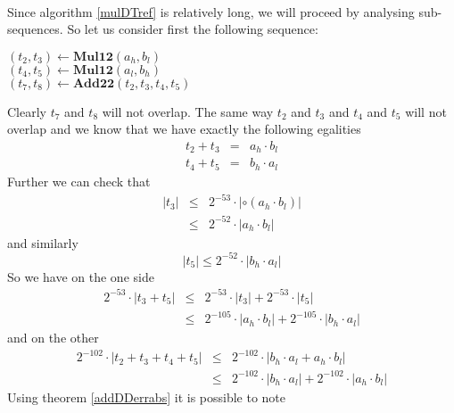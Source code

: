 \documentclass[a4paper,10pt,twoside]{article}
\newenvironment{proof}[1][Proof]{\begin{trivlist}
\item[\hskip \labelsep {\bfseries #1}]}{\end{trivlist}}
\newcommand{\hi}{\ensuremath{\mathit{h}}}
\newcommand{\lo}{\ensuremath{\mathit{l}}}
\newcommand{\mAddDD}{\ensuremath{\mathbf{Add22}}}
\newcommand{\mMul}{\ensuremath{\mathbf{Mul12}}}
\begin{document}
\begin{proof} ~ \\
Since algorithm \ref{mulDTref} is relatively long, we will proceed by analysing sub-sequences. So let us consider
first the following sequence:
\begin{center}
\begin{minipage}[b]{50mm}
$\left( t_2, t_3 \right) \gets \mMul\left( a_\hi, b_\lo \right)$ \\
$\left( t_4, t_5 \right) \gets \mMul\left( a_\lo, b_\hi \right)$ \\
$\left( t_7, t_8 \right) \gets \mAddDD\left( t_2, t_3, t_4, t_5 \right)$ 
\end{minipage}
\end{center}
Clearly $t_7$ and $t_8$ will not overlap. The same way $t_2$ and $t_3$ and $t_4$ and $t_5$ will not overlap and 
we know that we have exactly the following egalities
\begin{eqnarray*}
t_2 + t_3 & = & a_\hi \cdot b_\lo \\
t_4 + t_5 & = & b_\hi \cdot a_\lo 
\end{eqnarray*}
Further we can check that 
\begin{eqnarray*}
\left \vert t_3 \right \vert & \leq & 2^{-53} \cdot \left \vert \circ \left( a_\hi \cdot b_\lo \right) \right \vert \\
& \leq & 2^{-52} \cdot \left \vert a_\hi \cdot b_\lo \right \vert 
\end{eqnarray*}
and similarly
$$\left \vert t_5 \right \vert \leq 2^{-52} \cdot \left \vert b_\hi \cdot a_\lo \right \vert$$
So we have on the one side
\begin{eqnarray*}
2^{-53} \cdot \left \vert t_3 + t_5 \right \vert & \leq & 2^{-53} \cdot \left \vert t_3 \right \vert + 2^{-53} \cdot \left \vert t_5 \right \vert \\
& \leq & 2^{-105} \cdot \left \vert a_\hi \cdot b_\lo \right \vert + 2^{-105} \cdot \left \vert b_\hi \cdot a_\lo \right \vert 
\end{eqnarray*}
and on the other
\begin{eqnarray*}
2^{-102} \cdot \left \vert t_2 + t_3 + t_4 + t_5 \right \vert & \leq & 2^{-102} \cdot \left \vert 
                 b_\hi \cdot a_\lo + a_\hi \cdot b_\lo \right \vert \\
& \leq & 2^{-102} \cdot \left \vert b_\hi \cdot a_\lo \right \vert + 2^{-102} \cdot \left \vert a_\hi \cdot b_\lo \right \vert 
\end{eqnarray*}
Using theorem \ref{addDDerrabs} it is possible to note 

\end{proof}
\end{document}

